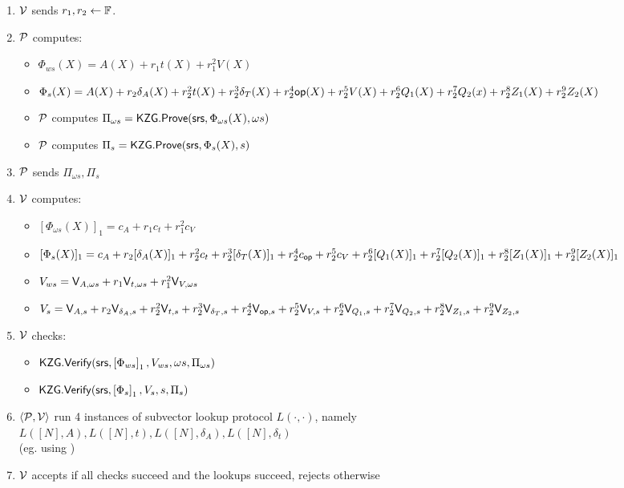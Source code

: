 \begin{figure}[htbp]
\begin{mdframed}
{\begin{enumerate}[leftmargin=1em, label=\arabic*]
\begin{itemize}
            \end{itemize}
            \item $\verifier$ sends $r_1, r_2\gets\F$.
            \item $\prover$ computes:
            \begin{itemize}
                \item $\Phi_{ws}(X)= A(X)+r_1 t(X) +r_1^2 V(X)$
                \item $\Phi_s(X)=A(X)+r_2 \delta_A(X)+r_2^2 t(X)+ r_2^3 \delta_T(X)+r_2^4 \op(X) +r_2^5 V(X)+r_2^6 Q_1(X)+ r_2^7 Q_2(x)+r_2^8 Z_1(X)+r_2^9 Z_2(X)$
                \item $\prover$ computes $\Pi_{\omega s} = \KZGopen(\srs, \Phi_{\omega s}(X), \omega s)$
                \item $\prover$ computes $\Pi_{s} = \KZGopen(\srs, \Phi_{s}(X),s)$




            \end{itemize}
            \item $\prover$ sends $\Pi_{\omega s}, \Pi_{s}$
            \item $\verifier$ computes:
            \begin{itemize}
                \item $[\Phi_{\omega s}(X)]_1= c_A +r_1 c_t + r_1^2 c_V$
                \item $[\Phi_{s}(X)]_1= c_A +r_2 [\delta_A(X)]_1 + r_2^2 c_t +r_2^3 [\delta_T(X)]_1 +r_2^4 c_{\op} +r_2^5 c_V +r_2^6 [Q_1(X)]_1 +r_2^7 [Q_2(X)]_1 +r_2^8 [Z_1(X)]_1 + r_2^9 [Z_2(X)]_1 $
                \item $V_{ws}= \val{\omega s}{A}+r_1 \val{\omega s}{t}+ r_1^2 \val{\omega s}{V}$
                \item $V_s=\val{s}{A}+r_2 \val{s}{\delta_A}+r_2^2 \val{s}{t}+r_2^3 \val{s}{\delta_T}+r_2^4 \val{s}{\op} +r_2^5 \val{s}{V} +r_2^6 \val{s}{Q_1} +r_2^7 \val{s}{Q_2}+r_2^8 \val{s}{Z_1} +r_2^9 \val{s}{Z_2}$
            \end{itemize}
            \item $\verifier$ checks:
            \begin{itemize}
                \item $\KZGverify(\srs, \gone{\Phi_{ws}}, V_{ws}, \omega s, \Pi_{\omega s})$
                \item $\KZGverify(\srs, \gone{\Phi_{s}}, V_{s}, s, \Pi_{s})$
            \end{itemize}

            \item $\left<\prover, \verifier\right>$ run 4 instances of subvector lookup protocol $L(\cdot, \cdot)$, namely $L([N], A), L([N], t), L([N], \delta_A), L([N], \delta_t)$ \\
            (eg. using \cite{EPRINT:EagFioGab22})
            \item $\verifier$ accepts if all checks succeed and the lookups succeed, rejects otherwise
        \end{enumerate}
    }
    \end{mdframed}


\end{figure}
